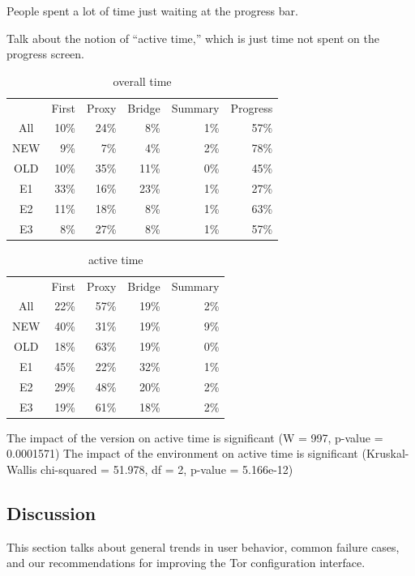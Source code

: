 \documentclass[USenglish,oneside,twocolumn]{article}
\begin{document}
People spent a lot of time just waiting at the progress bar. 

Talk about the notion of ``active time,'' which is just time not spent on the progress screen. 

\begin{table}
\centering
	\begin{tabular}{c r r r r r}
	 & First & Proxy & Bridge & Summary & Progress \\
	\noalign{\hrule}
	All &  10\% & 24\% & 8\% & 1\% & 57\% \\
	NEW & 9\% & 7\% & 4\% & 2\% &  78\% \\
	OLD & 10\% & 35\% & 11\% & 0\% & 45\% \\
	E1 & 33\% & 16\% & 23\% & 1\% & 27\% \\
	E2 & 11\% & 18\% & 8\% & 1\% & 63\% \\
	E3 & 8\% & 27\% & 8\% & 1\% & 57\% \\
	\end{tabular}
\caption{overall time} 
\label{table:overall_time}
\end{table}

\begin{table}
\centering
	\begin{tabular}{c r r r r }
	 & First & Proxy & Bridge & Summary \\
	\noalign{\hrule}
	All & 22\% & 57\% & 19\% & 2\% \\
	NEW & 40\% & 31\% & 19\% & 9\% \\ 
	OLD & 18\% & 63\% & 19\% & 0\% \\
	E1 & 45\% & 22\% & 32\% & 1\% \\
	E2 & 29\% & 48\% & 20\% & 2\% \\
	E3 & 19\% & 61\% & 18\% & 2\% \\
	\end{tabular}
\caption{active time} 
\label{table:active_time}
\end{table}

The impact of the version on active time is significant (W = 997, p-value = 0.0001571)
The impact of the environment on active time is significant (Kruskal-Wallis chi-squared = 51.978, df = 2, p-value = 5.166e-12)

\subsection{Discussion} 
This section talks about general trends in user behavior, common failure cases, and our recommendations for 
improving the Tor configuration interface. 
\end{document}
